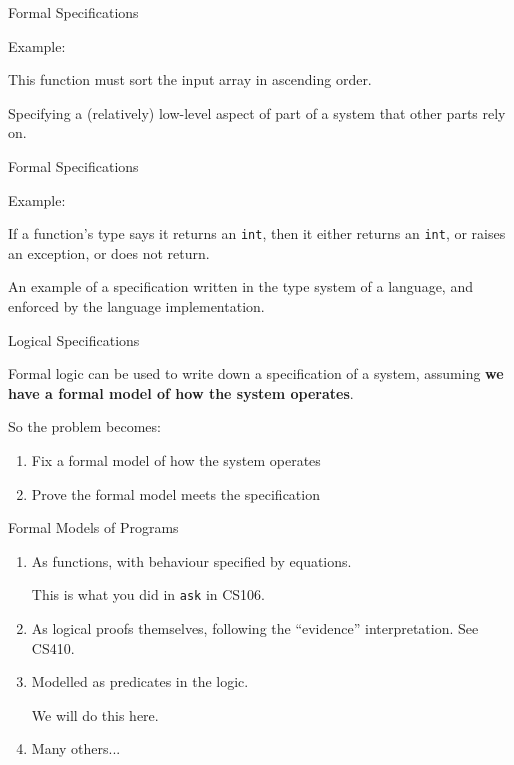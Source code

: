 \documentclass[xetex,aspectratio=169,14pt,hyperref={pdfpagelabels=true,pdflang={en-GB}}]{beamer}
\begin{document}
\begin{frame}
  {Formal Specifications}

  Example:

  \bigskip

  \begin{center}
    This function must sort the input array in ascending order.
  \end{center}

  \bigskip

  Specifying a (relatively) low-level aspect of part of a system that
  other parts rely on.
\end{frame}

\begin{frame}
  {Formal Specifications}

  Example:

  \bigskip

  \begin{center}
    If a function's type says it returns an \texttt{int}, then it
    either returns an \texttt{int}, or raises an exception, or does
    not return.
  \end{center}

  \bigskip

  An example of a specification written in the type system of a
  language, and enforced by the language implementation.
\end{frame}

\begin{frame}
  {Logical Specifications}

  Formal logic can be used to write down a specification of a system,
  assuming {\bf we have a formal model of how the system operates}.

  \bigskip
  \pause

  So the problem becomes:
  \begin{enumerate}
  \item Fix a formal model of how the system operates
  \item Prove the formal model meets the specification
  \end{enumerate}

\end{frame}

\begin{frame}
  {Formal Models of Programs}

  \begin{enumerate}
  \item As functions, with behaviour specified by equations.

    This is what you did in \texttt{ask} in CS106.

    \bigskip
  \item As logical proofs themselves, following the ``evidence''
    interpretation. See CS410.

    \bigskip
  \item Modelled as predicates in the logic.

    We will do this here.

    \bigskip
  \item Many others...
  \end{enumerate}
\end{frame}
\end{document}

